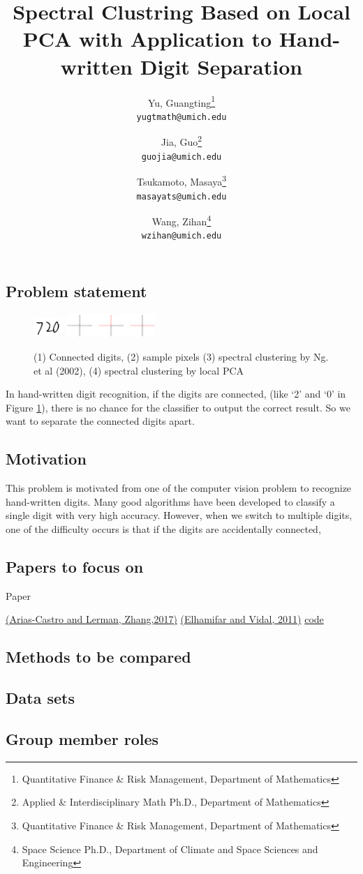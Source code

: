 \documentclass[10pt,twocolumn]{article}
\title{\large{Spectral Clustring Based on Local PCA with Application to Hand-written Digit Separation}}
\author{
    Yu, Guangting\thanks{Quantitative Finance \& Risk Management, Department of Mathematics} \\
    \small{\texttt{yugtmath@umich.edu}}
    \and
    Jia, Guo\thanks{Applied \& Interdisciplinary Math Ph.D., Department of Mathematics} \\
    \texttt{guojia@umich.edu}
    \and
    Tsukamoto, Masaya\thanks{Quantitative Finance \& Risk Management, Department of Mathematics} \\
    \texttt{masayats@umich.edu}
    \and
    Wang, Zihan\thanks{Space Science Ph.D., Department of Climate and Space Sciences and Engineering} \\
    \texttt{wzihan@umich.edu}
}
\begin{document}
\maketitle

\subsection*{Problem statement}
\begin{figure}[htbp]
\centering
\includegraphics[width=0.1\textwidth]{connected-digits.png}
\hspace{1em}
\includegraphics[width=0.3\textwidth]{effect.png}
\caption{(1) Connected digits, (2) sample pixels (3) spectral clustering by Ng. et al (2002), (4) spectral clustering by local PCA}
\label{fig1}
\end{figure}
In hand-written digit recognition, if the digits are connected, (like `2' and `0' in Figure \ref{fig1}), there is no chance for the classifier to output the correct result.
So we want to separate the connected digits apart.
\subsection*{Motivation}
This problem is motivated from one of the computer vision problem to recognize hand-written digits.
Many good algorithms have been developed to classify a single digit with very high accuracy.
However, when we switch to multiple digits, one of the difficulty occurs is that if the digits are accidentally connected, 
\subsection*{Papers to focus on}
Paper 


\href{http://www.jmlr.org/papers/volume18/14-318/14-318.pdf}{(Arias-Castro and Lerman, Zhang,2017)}
\href{https://papers.nips.cc/paper/4246-sparse-manifold-clustering-and-embedding.pdf}{(Elhamifar and Vidal, 2011)}
\href{http://sciences.ucf.edu/math/tengz/wp-content/uploads/sites/45/2016/07/code.zip}{code}
\cite{Arias-Castro:2017:SCB:3122009.3122018}
\subsection*{Methods to be compared}
\subsection*{Data sets}
\subsection*{Group member roles}

\newpage
{}

\end{document}
